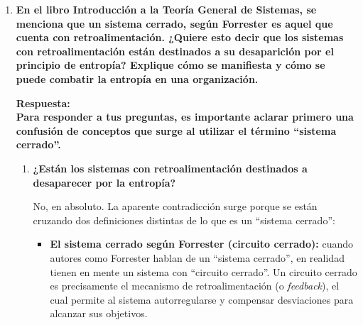 \documentclass[12pt,a4paper]{article}
\begin{document}
\begin{enumerate}[label=\textbf{Pregunta \arabic*.}]
\begin{itemize}
              \item Se descarta c) "significa que la información no puede almacenarse": Es una premisa falsa. Que no se comporte bajo la ley de conservación no impide su almacenamiento. De hecho, la mencionada "ley de los incrementos" afirma que en el sistema siempre existe una "agregación neta" entre la información que ya existe y la nueva que ingresa, demostrando que la información permanece y se acumula (almacena) en el sistema.
              \item Se descarta d) "constituye una limitación del enfoque de sistemas": Totalmente falso. La incapacidad de aplicar la ley de conservación a la información no limita al enfoque sistémico. Al contrario, la Teoría General de Sistemas y la Cibernética se nutren del concepto de información (a través de la comunicación, retroalimentación y la entropía negativa) para explicar cómo los organismos biológicos y las organizaciones sociales logran controlarse, adaptarse a su entorno y sobrevivir.
          \end{itemize}
    \item \textbf{
              En el libro Introducción a la Teoría General de Sistemas, se
              menciona que un sistema cerrado, según Forrester es aquel que
              cuenta con retroalimentación. ¿Quiere esto decir que los
              sistemas con retroalimentación están destinados a su
              desaparición por el principio de entropía?
              Explique cómo se manifiesta y cómo se puede combatir la
              entropía en una organización.
          }

          \textbf{Respuesta:} \\
          \textbf{Para responder a tus preguntas, es importante aclarar primero una confusión de conceptos que surge al utilizar el término ``sistema cerrado''.}
          \begin{enumerate}

              \item \textbf{¿Están los sistemas con retroalimentación destinados a desaparecer por la entropía?}

                    No, en absoluto. La aparente contradicción surge porque se están cruzando dos definiciones distintas de lo que es un ``sistema cerrado'':

                    \begin{itemize}
                        \item \textbf{El sistema cerrado según Forrester (circuito cerrado):} cuando autores como Forrester hablan de un ``sistema cerrado'', en realidad tienen en mente un sistema con ``circuito cerrado''. Un circuito cerrado es precisamente el mecanismo de retroalimentación (o \textit{feedback}), el cual permite al sistema autorregularse y compensar desviaciones para alcanzar sus objetivos.


\end{itemize}
\end{enumerate}
\end{enumerate}
\end{document}
